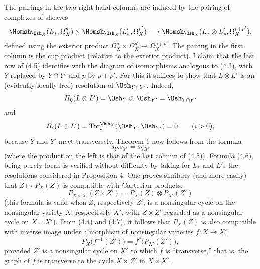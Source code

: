 The pairings in the two right-hand columns are induced by the pairing of
complexes of sheaves
\[
\Homsh_{\Osh_X}(L_{*},\Omega_X^{p})
\times\Homsh_{\Osh_X}(L'_{*},\Omega_X^{p'})
\longrightarrow
\Homsh_{\Osh_X}(L_{*}\otimes L'_{*},\Omega_X^{p+p'}),
\]
defined using the exterior product
$\Omega_X^{p}\times\Omega_X^{p'}\longrightarrow\Omega_X^{p+p'}$.
The pairing in the first column is the cup product (relative to the exterior
product). I claim that the last row of (4.5) identifies with the diagram of
isomorphisms analogous to (4.3), with $Y$ replaced by $Y\cap Y'$ and $p$ by
$p+p'$. For this it suffices to show that $L\otimes L'$ is an (evidently locally
free) resolution of $\Osh_{Y\cap Y'}$. Indeed,
\[
  H_0(L\otimes L')=\Osh_Y\otimes\Osh_{Y'}=\Osh_{Y\cap Y'}
\]
and
\[
  H_i(L\otimes L')=\operatorname{Tor}_{i}^{\Osh_X}(\Osh_Y,\Osh_{Y'})=0
  \qquad(i>0),
\]
because $Y$ and $Y'$ meet transversely. Theorem 1 now follows from the formula
\begin{equation}\tag{4.6}
  s_Y.s_{Y'}=s_{Y.Y'}
\end{equation}
(where the product on the left is that of the last column of (4.5)). Formula
(4.6), being purely local, is verified without difficulty by taking for $L_{*}$
and $L'_{*}$ the resolutions considered in Proposition 4. One proves similarly
(and more easily) that $Z\longmapsto P_X(Z)$ is compatible with Cartesian
products:
\begin{equation}\tag{4.7}
  P_{X\times X'}(Z\times Z')=P_X(Z)\otimes P_{X'}(Z')
\end{equation}
(this formula is valid when $Z$, respectively $Z'$, is a nonsingular cycle on
the nonsingular variety $X$, respectively $X'$, with $Z\times Z'$ regarded as a
nonsingular cycle on $X\times X'$). From (4.4) and (4.7), it follows that
$P_X(Z)$ is also compatible with inverse image under a morphism of nonsingular
varieties $f:X\longrightarrow X'$:
\begin{equation}\tag{4.8}
  P_X\bigl(f^{-1}(Z')\bigr)=f^{*}\bigl(P_{X'}(Z')\bigr),
\end{equation}
provided $Z'$ is a nonsingular cycle on $X'$ to which $f$ is “transverse,” that
is, the graph of $f$ is transverse to the cycle $X\times Z'$ in $X\times X'$.


